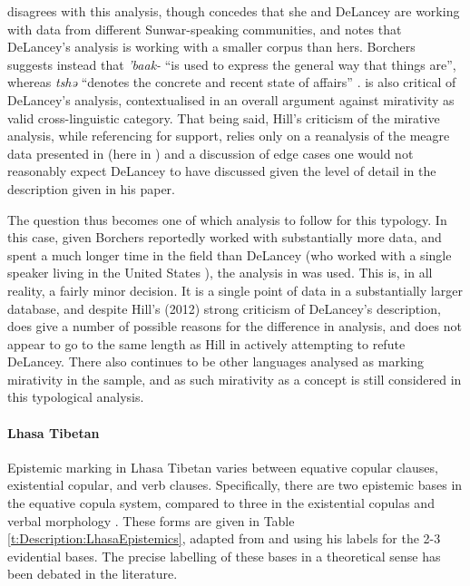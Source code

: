  disagrees with this analysis, though concedes that she and DeLancey are working with data from different Sunwar-speaking communities, and notes that DeLancey's analysis is working with a smaller corpus than hers. Borchers suggests instead that \textit{'baak-} ``is used to express the general way that things are'', whereas \textit{tshə} ``denotes the concrete and recent state of affairs'' \cite[164]{Borchers2008}.  is also critical of DeLancey's analysis, contextualised in an overall argument against mirativity as valid cross-linguistic category. That being said, Hill's criticism of the mirative analysis, while referencing  for support, relies only on a reanalysis of the meagre data presented in  (here in ) and a discussion of edge cases one would not reasonably expect DeLancey to have discussed given the level of detail in the description given in his paper.

The question thus becomes one of which analysis to follow for this typology. In this case, given Borchers reportedly worked with substantially more data, and spent a much longer time in the field than DeLancey (who worked with a single speaker living in the United States \cite{DeLanceyMirativity1997}), the analysis in  was used. This is, in all reality, a fairly minor decision. It is a single point of data in a substantially larger database, and despite Hill's (2012) strong criticism of DeLancey's description,  does give a number of possible reasons for the difference in analysis, and does not appear to go to the same length as Hill in actively attempting to refute DeLancey. There also continues to be other languages analysed as marking mirativity in the sample, and as such mirativity as a concept is still considered in this typological analysis.

\paragraph{Lhasa Tibetan}
Epistemic marking in Lhasa Tibetan varies between equative copular clauses, existential copular, and verb clauses. Specifically, there are two epistemic bases in the equative copula system, compared to three in the existential copulas and verbal morphology \cite{DeLancey2017Tibetan}. These forms are given in Table \ref{t:Description:LhasaEpistemics}, adapted from  and using his labels for the 2-3 evidential bases. The precise labelling of these bases in a theoretical sense has been debated in the literature.

